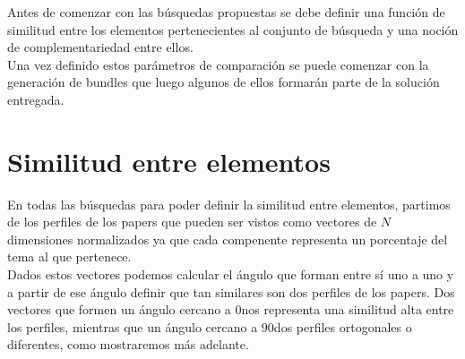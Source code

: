 Antes de comenzar con las búsquedas propuestas se debe definir una función de similitud entre los 
elementos pertenecientes al conjunto de búsqueda y una noción de complementariedad entre ellos.\\
Una vez definido estos parámetros de comparación se puede comenzar con la generación de bundles que 
luego algunos de ellos formarán parte de la solución entregada.
\section{Similitud entre elementos}
En todas las búsquedas para poder definir la similitud entre elementos, partimos de los perfiles de los papers que pueden ser vistos como vectores de $N$ dimensiones normalizados ya que cada compenente representa un porcentaje del tema al que pertenece.\\
Dados estos vectores podemos calcular el ángulo que forman entre sí uno a uno y a partir de ese ángulo definir que tan similares son dos perfiles de los papers. Dos vectores que formen un ángulo cercano a $0$\textdegree nos representa una similitud alta entre los perfiles, mientras que un ángulo cercano a $90$\textdegree dos perfiles ortogonales o diferentes, como mostraremos más adelante.\\
